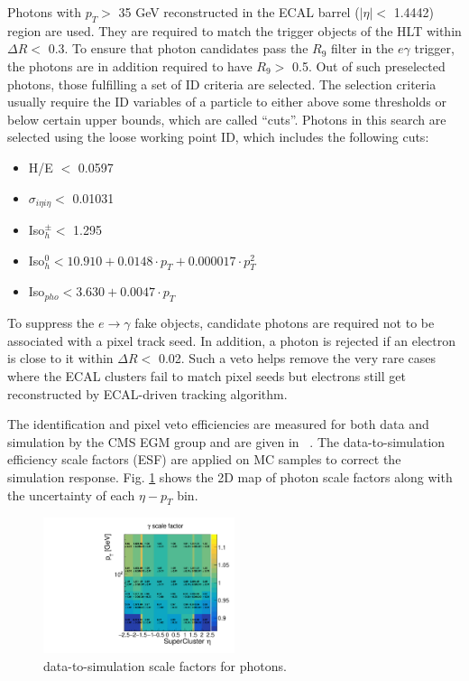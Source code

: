 \documentclass[thesis.tex]{subfiles}
\renewcommand\_{\textunderscore\allowbreak}
\begin{document}
Photons with $p_{T} >$ 35 GeV reconstructed in the ECAL barrel ($|\eta| <$ 1.4442) region are used. 
They are required to match the trigger objects of the HLT within $\Delta R <$ 0.3. 
To ensure that photon candidates pass the $R_9$ filter in the $e\gamma$ trigger, the photons are in addition required to have $R_9 >$ 0.5.
Out of such preselected photons, those fulfilling a set of ID criteria are selected.
The selection criteria usually require the ID variables of a particle to either above some thresholds or below certain upper bounds, which are called ``cuts''. 
Photons in this search are selected using the loose working point ID, which includes the following cuts: 
\begin{center}
\begin{itemize}
\item H/E $<$ 0.0597
\item $\sigma_{i\eta i\eta} <$ 0.01031 
\item Iso$_h^\pm <$ 1.295
\item Iso$_h^0 < 10.910 +0.0148 \cdot p_{T} + 0.000017 \cdot p^2_{T}$
\item Iso$_{pho} < 3.630+0.0047 \cdot p_{T}$
\end{itemize}
\end{center}

To suppress the $e\rightarrow\gamma$ fake objects, candidate photons are required not to be associated with a pixel track seed. 
In addition, a photon is rejected if an electron is close to it within $\Delta R <$ 0.02. 
Such a veto helps remove the very rare cases where the ECAL clusters fail to match pixel seeds but electrons still get reconstructed by ECAL-driven tracking algorithm.

The identification and pixel veto efficiencies are measured for both data and simulation by the CMS EGM group and are given in ~\cite{EGM:leptonScale}. The data-to-simulation efficiency scale factors (ESF) are applied on MC samples to correct the simulation response. Fig. \ref{fig:photonsf} shows the 2D map of photon scale factors along with the uncertainty of each $\eta-p_T$ bin.

\begin{figure}[hbt]
	\centering
	\includegraphics[width=0.5\textwidth]{plot/SF_Photon.pdf}
	\caption{data-to-simulation scale factors for photons.}
	\label{fig:photonsf}
\end{figure}
\end{document}
